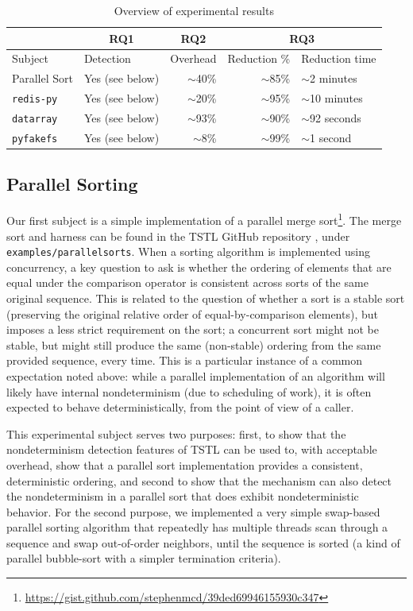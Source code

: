 \begin{table}
  \centering
  {\scriptsize
\begin{tabular}{l|l|r|r|l}
& \multicolumn{1}{c}{\bf RQ1} & \multicolumn{1}{|c|}{\bf RQ2} &
                                                              \multicolumn{2}{c}{\bf RQ3}\\
  \hline
Subject & Detection & Overhead & Reduction \%
                                                        & Reduction time\\
\hline
Parallel Sort & Yes (see below) & $\sim$40\% & $\sim$85\% & $\sim$2 minutes\\
{\tt redis-py} & Yes (see below) & $\sim$20\% & $\sim$95\% & $\sim$10 minutes\\
{\tt datarray} & Yes (see below) & $\sim$93\% & $\sim$90\% & $\sim$92
  seconds\\
{\tt pyfakefs} & Yes (see below) & $\sim$8\% & $\sim$99\% & $\sim$1 second  \\
\end{tabular}
}
\caption{Overview of experimental results}
\label{tab:overviewexp}
\end{table}

\subsection{Parallel Sorting}

Our first subject is a simple implementation of a parallel merge
sort\footnote{\url{https://gist.github.com/stephenmcd/39ded69946155930c347}}.  The
merge sort and harness can be found in the TSTL GitHub repository
\cite{tstl}, under {\tt examples/parallelsorts}.  When a sorting
algorithm is implemented using concurrency, a key question to ask is
whether the ordering of elements that are equal under the comparison
operator is consistent across sorts of the same original sequence.
This is related to the question of whether a sort is a stable sort
(preserving the original relative order of equal-by-comparison elements),
but imposes a less strict requirement on the sort; a concurrent sort
might not be stable, but might still produce the same (non-stable)
ordering from the same provided sequence, every time.  This is a
particular instance of a common expectation noted above:  while a parallel
implementation of an algorithm will likely have internal
nondeterminism (due to scheduling of work), it is often expected to
behave deterministically, from the point of view of a caller.

This experimental subject serves two purposes:  first, to show that the
nondeterminism detection features of TSTL can be used to, with
acceptable overhead, show that a parallel sort implementation provides
a consistent, deterministic ordering, and second to show that the
mechanism can also detect the nondeterminism in a parallel sort that
does exhibit nondeterministic behavior.  For the second purpose, we
implemented a very simple swap-based parallel sorting algorithm that
repeatedly has multiple threads scan through a sequence and swap
out-of-order neighbors, until the sequence is sorted (a kind of
parallel bubble-sort with a simpler termination criteria).

